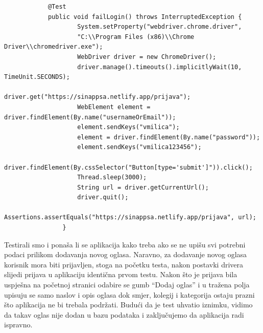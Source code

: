 			\begin{verbatim}
		    @Test
		    public void failLogin() throws InterruptedException {
			        System.setProperty("webdriver.chrome.driver", 
			        "C:\\Program Files (x86)\\Chrome Driver\\chromedriver.exe");
			        WebDriver driver = new ChromeDriver();
			        driver.manage().timeouts().implicitlyWait(10, TimeUnit.SECONDS);
			        driver.get("https://sinappsa.netlify.app/prijava");
			        WebElement element = driver.findElement(By.name("usernameOrEmail"));
			        element.sendKeys("vmilica");
			        element = driver.findElement(By.name("password"));
			        element.sendKeys("vmilica123456");
			        driver.findElement(By.cssSelector("Button[type='submit']")).click();
			        Thread.sleep(3000);
			        String url = driver.getCurrentUrl();
			        driver.quit();
			        Assertions.assertEquals("https://sinappsa.netlify.app/prijava", url);
			    }
			\end{verbatim}
			Testirali smo i ponaša li se aplikacija kako treba ako se ne upišu svi potrebni podaci prilikom dodavanja novog oglasa. Naravno, za dodavanje novog oglasa korisnik mora biti prijavljen, stoga na početku testa, nakon postavki drivera slijedi prijava u aplikaciju identična prvom testu. Nakon što je prijava bila uspješna na početnoj stranici odabire se gumb “Dodaj oglas” i u tražena polja upisuju se samo naslov i opis oglasa dok smjer, kolegij i kategorija ostaju prazni što aplikacija ne bi trebala podržati. Budući da je test uhvatio iznimku, vidimo da takav oglas nije dodan u bazu podataka i zaključujemo da aplikacija radi ispravno.
			

